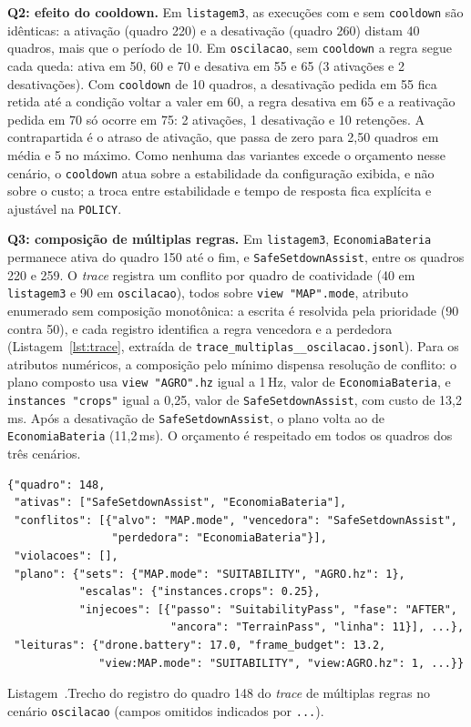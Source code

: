 \documentclass[conference]{IEEEtran}
\renewcommand{\lstlistingname}{Listagem}
\newenvironment{blocolst}%
  {\par\medskip\noindent\begin{minipage}{\columnwidth}}%
  {\end{minipage}\par\medskip}
\newcommand{\legendalst}[2]{%
  \par\vspace{2pt}%
  \refstepcounter{lstlisting}\label{#1}%
  {\footnotesize\lstlistingname~\thelstlisting.\enspace #2\par}}
\begin{document}
\textbf{Q2: efeito do cooldown.} Em \texttt{listagem3}, as execuções com e sem
\texttt{cooldown} são idênticas: a ativação (quadro 220) e a desativação
(quadro 260) distam 40 quadros, mais que o período de 10. Em
\texttt{oscilacao}, sem \texttt{cooldown} a regra segue cada queda: ativa em 50,
60 e 70 e desativa em 55 e 65 (3 ativações e 2 desativações). Com
\texttt{cooldown} de 10 quadros, a desativação pedida em 55 fica retida até a
condição voltar a valer em 60, a regra desativa em 65 e a reativação pedida em
70 só ocorre em 75: 2 ativações, 1 desativação e 10 retenções. A contrapartida
é o atraso de ativação, que passa de zero para 2,50 quadros em média e 5 no
máximo. Como nenhuma das variantes excede o orçamento nesse cenário, o
\texttt{cooldown} atua sobre a estabilidade da configuração exibida, e não sobre
o custo; a troca entre estabilidade e tempo de resposta fica explícita e
ajustável na \texttt{POLICY}.

\textbf{Q3: composição de múltiplas regras.} Em \texttt{listagem3},
\texttt{EconomiaBateria} permanece ativa do quadro 150 até o fim, e
\texttt{SafeSetdownAssist}, entre os quadros 220 e 259. O \textit{trace}
registra um conflito por quadro de coatividade (40 em \texttt{listagem3} e 90
em \texttt{oscilacao}), todos sobre \texttt{view "MAP".mode}, atributo
enumerado sem composição monotônica: a escrita é resolvida pela prioridade
(90 contra 50), e cada registro identifica a regra vencedora e a perdedora
(Listagem~\ref{lst:trace}, extraída de
\texttt{trace\_multiplas\_\_oscilacao.jsonl}). Para os atributos numéricos, a
composição pelo mínimo dispensa resolução de conflito: o plano composto usa
\texttt{view "AGRO".hz} igual a 1\,Hz, valor de \texttt{EconomiaBateria}, e
\texttt{instances "crops"} igual a 0,25, valor de \texttt{SafeSetdownAssist},
com custo de 13,2\,ms. Após a desativação de \texttt{SafeSetdownAssist}, o
plano volta ao de \texttt{EconomiaBateria} (11,2\,ms). O orçamento é respeitado
em todos os quadros dos três cenários.

\begin{blocolst}
\begin{lstlisting}[style=saida]
{"quadro": 148,
 "ativas": ["SafeSetdownAssist", "EconomiaBateria"],
 "conflitos": [{"alvo": "MAP.mode", "vencedora": "SafeSetdownAssist",
                "perdedora": "EconomiaBateria"}],
 "violacoes": [],
 "plano": {"sets": {"MAP.mode": "SUITABILITY", "AGRO.hz": 1},
           "escalas": {"instances.crops": 0.25},
           "injecoes": [{"passo": "SuitabilityPass", "fase": "AFTER",
                         "ancora": "TerrainPass", "linha": 11}], ...},
 "leituras": {"drone.battery": 17.0, "frame_budget": 13.2,
              "view:MAP.mode": "SUITABILITY", "view:AGRO.hz": 1, ...}}
\end{lstlisting}
\legendalst{lst:trace}{Trecho do registro do quadro 148 do \textit{trace} de
múltiplas regras no cenário \texttt{oscilacao} (campos omitidos indicados por
\texttt{...}).}
\end{blocolst}
\end{document}
